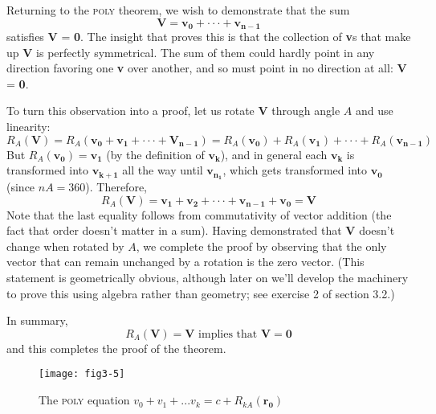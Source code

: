 \documentclass{book}
\begin{document}
Returning to the \textsc{poly} theorem, we wish to demonstrate that the sum
$$\mathbf{V} = \mathbf{v_0} + \cdot \cdot \cdot + \mathbf{v_{n-1}}$$
\noindent satisfies \textbf{V} = \textbf{0}. The insight that proves this is that the collection of \textbf{v}s
that make up \textbf{V} is perfectly symmetrical. The sum of them could hardly
point in any direction favoring one \textbf{v} over another, and so must point in
no direction at all: \textbf{V} = \textbf{0}.

To turn this observation into a proof, let us rotate \textbf{V} through angle $A$
and use linearity:
$$R_A(\mathbf{V}) = R_A(\mathbf{v_0} + \mathbf{v_1} + \cdot \cdot \cdot + \mathbf{V_{n-1}}) = R_A(\mathbf{v_0}) + R_A(\mathbf{v_1}) + \cdot \cdot \cdot + R_A(\mathbf{v_{n-1}})$$
\noindent But $R_A(\mathbf{v_0}) = \mathbf{v_1}$ (by the definition of $\mathbf{v_k}$), and in general each $\mathbf{v_k}$ is
transformed into $\mathbf{v_{k+1}}$ all the way until $\mathbf{v_{n_1}}$, which gets transformed
into $\mathbf{v_0}$ (since $nA = 360$). Therefore,
$$R_A(\mathbf{V}) = \mathbf{v_1} + \mathbf{v_2} + \cdot \cdot \cdot +\mathbf{v_{n-1}} + \mathbf{v_0} = \mathbf{V} $$
Note that the last equality follows from commutativity of vector addition
(the fact that order doesn't matter in a sum).
Having demonstrated that \textbf{V} doesn't change when rotated by $A$, we
complete the proof by observing that the only vector that can remain
unchanged by a rotation is the zero vector. (This statement is geometrically obvious, although later on we'll develop the machinery to prove
this using algebra rather than geometry; see exercise 2 of section 3.2.)

In summary,
$$R_A(\mathbf{V}) = \mathbf{V} \text{ implies that } \mathbf{V} = \mathbf{0}$$
\noindent and this completes the proof of the theorem.

\begin{figure}
\begin{center}
\texttt{[image: fig3-5]}
\caption{The \textsc{poly} equation $v_0 + v_1 + . . . v_k = c + R_{kA}(\mathbf{r_0})$}
\end{center}
\end{figure}
\end{document}
